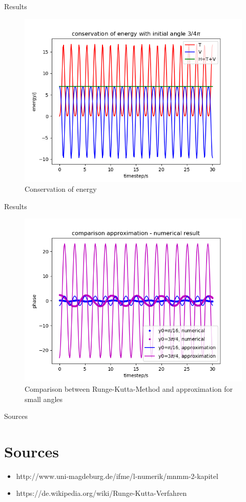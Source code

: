 \documentclass[9pt]{beamer}
\begin{document}
\begin{frame}{Results}
\begin{figure}
	\centering
	\includegraphics[scale=0.5]{Figure_3.png}
	\caption{Conservation of energy}
\end{figure}
\end{frame}

\begin{frame}{Results}
\begin{figure}
\centering
	\includegraphics[scale=0.5]{Figure_2.png}
	\caption{Comparison between Runge-Kutta-Method and approximation for small angles }
\end{figure}

\end{frame}

\begin{frame}{Sources}
\section{Sources}
\begin{itemize}
\item http://www.uni-magdeburg.de/ifme/l-numerik/mnmm-2-kapitel%
\item https://de.wikipedia.org/wiki/Runge-Kutta-Verfahren
\end{itemize}


\end{frame}
\end{document}
